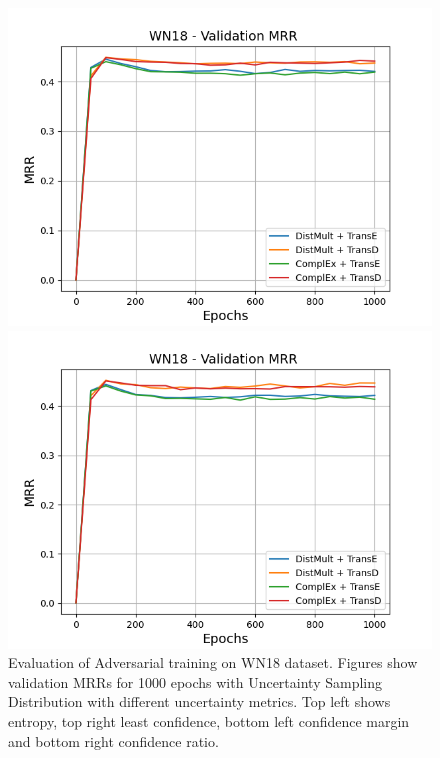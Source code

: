 \begin{figure}
    \begin{minipage}{.5\textwidth}
      \centering
      \includegraphics[width=0.9\linewidth]{figures/results/gan_train/not_pretrained/uncertainty/max_distribution/confidence_margin/wn18/uncertainty_wn18_mrrs.png}
    \end{minipage}%
    \begin{minipage}{.5\textwidth}
      \centering
      \includegraphics[width=0.9\linewidth]{figures/results/gan_train/not_pretrained/uncertainty/max_distribution/confidence_ratio/wn18/uncertainty_wn18_mrrs.png}
    \end{minipage}%
    \caption{Evaluation of Adversarial training on \textsc{WN18} dataset. 
    Figures show validation MRRs for 1000 epochs with Uncertainty Sampling Distribution with different uncertainty metrics.
    Top left shows entropy, top right least confidence, 
    bottom left confidence margin and bottom right confidence ratio.}
    \label{fig:advtrain_metrics_wn18}
\end{figure}

